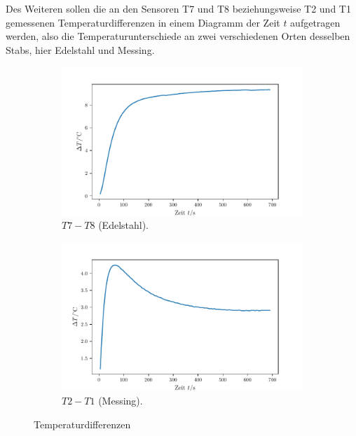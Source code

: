 Des Weiteren sollen die an den Sensoren T7 und T8 beziehungsweise T2 und T1 gemessenen Temperaturdifferenzen in einem 
Diagramm der Zeit $t$ aufgetragen werden, also die Temperaturunterschiede an zwei verschiedenen Orten desselben Stabs, 
hier Edelstahl und Messing.
\begin{figure}
    \centering
    \begin{subfigure}{.5\textwidth}
        \centering
        \includegraphics[max width=1.1\linewidth]{plots/plot_tempDiff_steel.pdf}
        \caption{$T7 - T8$ (Edelstahl).}
        \label{fig:plot_tempDiff_t7t8}
    \end{subfigure}%
    \begin{subfigure}{.5\textwidth}
        \includegraphics[max width=1.1\linewidth]{plots/plot_tempDiff_brass_wide.pdf}
        \caption{$T2 - T1$ (Messing).}
        \label{fig:plot_tempDiff_t2t1}
    \end{subfigure}
    \caption{Temperaturdifferenzen}
    \label{fig:tempDiff_t1t4t5t8}
\end{figure}

